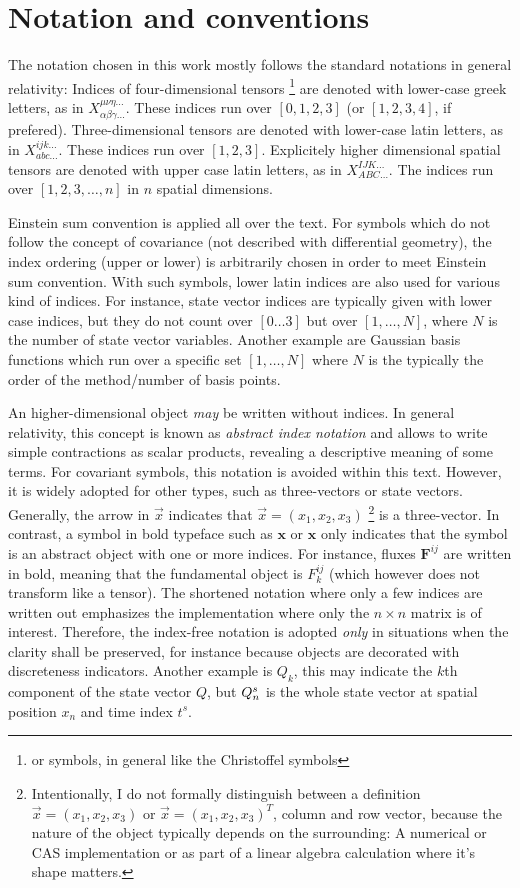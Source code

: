 \section{Notation and conventions}
The notation chosen in this work mostly follows
the standard notations in general relativity:
Indices of four-dimensional tensors
\footnote{or symbols, in general like the Christoffel symbols}
are denoted with lower-case greek letters,
as in $X_{\alpha\beta\gamma\dots}^{\mu\nu\eta\dots}$.
These indices run over $[0,1,2,3]$ (or $[1,2,3,4]$, if prefered).
Three-dimensional tensors are denoted with lower-case latin letters,
as in $X_{abc\dots}^{ijk\dots}$. These indices run over $[1,2,3]$.
Explicitely higher dimensional spatial tensors are denoted
with upper case latin letters, as in $X_{ABC\dots}^{IJK\dots}$.
The indices run over $[1,2,3,\dots,n]$ in $n$ spatial
dimensions.

Einstein sum convention is applied all over the text. For symbols
which do not follow the concept of covariance (\ie not described
with differential geometry), the index ordering (upper or lower)
is arbitrarily chosen in order to meet Einstein sum convention.
With such symbols, lower latin indices are also used for various
kind of indices.
For instance, state vector indices are typically given with lower
case indices, but they do not count over $[0\dots 3]$ but over
$[1,\dots,N]$, where $N$ is the number of state vector variables.
Another example are Gaussian basis functions which run over a
specific set $[1,\dots,N]$ where $N$ is the
typically the order of the method/number of basis points.

An higher-dimensional object \emph{may} be written without indices.
In general relativity, this concept is known as
\emph{abstract index notation} and allows to write simple contractions
as scalar products, revealing a descriptive meaning of some terms.
For covariant symbols, this notation is avoided within this text.
However, it is widely adopted for other types, such as three-vectors
or state vectors. Generally, the arrow in $\vec x$ indicates that
$\vec x = (x_1,x_2,x_3)$ \footnote{
  Intentionally, I do not formally distinguish between a definition
  $\vec x = (x_1,x_2,x_3)$ or $\vec x=(x_1,x_2,x_3)^T$, \ie
  column and row vector, because the nature of the object typically
  depends on the surrounding: A numerical or CAS implementation or
  as part of a linear algebra calculation where it's shape matters.
} is a three-vector. In contrast, a symbol in bold typeface such as
$\mathbf x$ or $\boldsymbol x$ only indicates that the symbol is
an abstract object with one or more indices. For instance, fluxes
$\boldsymbol F^{ij}$ are written in bold, meaning that the fundamental
object is $F^{ij}_k$ (which however does not transform like a tensor).
The shortened notation where only a few indices are written out
emphasizes the implementation where only the $n \times n$ matrix is
of interest. Therefore, the index-free notation is adopted \emph{only}
in situations when the clarity shall be preserved, for instance because
objects are decorated with discreteness indicators. Another example is
$Q_k$, this may indicate the $k$th component of the state vector
$Q$, but $\boldmath Q_n^s$ is the whole state vector at spatial position
$x_n$ and time index $t^s$.


